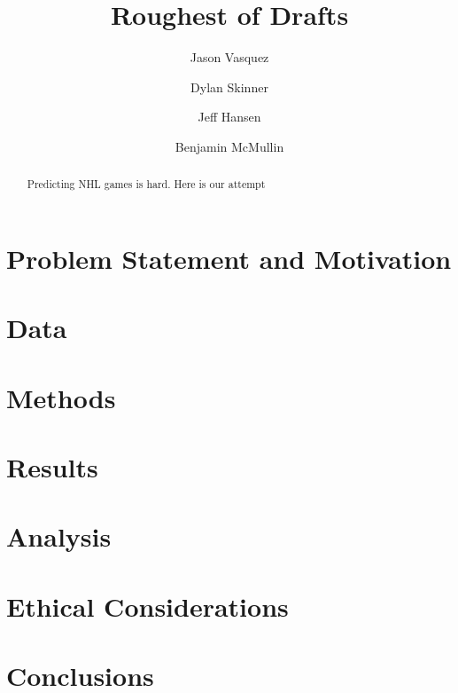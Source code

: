 \documentclass[11pt]{article}
\title{Roughest of Drafts}
\author{Jason Vasquez \and Dylan Skinner \and Jeff Hansen \and Benjamin McMullin}
\begin{document}
\maketitle

\begin{abstract}
    Predicting NHL games is hard. Here is our attempt
\end{abstract}

\section{Problem Statement and Motivation}

\section{Data}

\section{Methods}

\section{Results}

\section{Analysis}

\section{Ethical Considerations}

\section{Conclusions}


\end{document}
